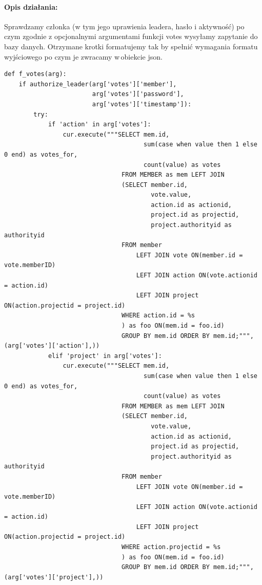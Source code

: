 \documentclass{article}
\begin{document}
\paragraph{Opis działania: }
Sprawdzamy członka (w tym jego uprawienia leadera, hasło i aktywność) po czym zgodnie z opcjonalnymi argumentami funkcji votes wysyłamy zapytanie do bazy danych.
Otrzymane krotki formatujemy tak by spełnić wymagania formatu wyjściowego po czym je zwracamy w\,obiekcie json. \newline
\begin{verbatim}
def f_votes(arg):
    if authorize_leader(arg['votes']['member'], 
                        arg['votes']['password'], 
                        arg['votes']['timestamp']):
        try:
            if 'action' in arg['votes']:
                cur.execute("""SELECT mem.id,
                                      sum(case when value then 1 else 0 end) as votes_for,
                                      count(value) as votes 
                                FROM MEMBER as mem LEFT JOIN
                                (SELECT member.id,
                                        vote.value,
                                        action.id as actionid, 
                                        project.id as projectid, 
                                        project.authorityid as authorityid
                                FROM member
                                    LEFT JOIN vote ON(member.id = vote.memberID)
                                    LEFT JOIN action ON(vote.actionid = action.id)
                                    LEFT JOIN project ON(action.projectid = project.id)
                                WHERE action.id = %s
                                ) as foo ON(mem.id = foo.id)
                                GROUP BY mem.id ORDER BY mem.id;""", (arg['votes']['action'],))
            elif 'project' in arg['votes']:
                cur.execute("""SELECT mem.id,
                                      sum(case when value then 1 else 0 end) as votes_for,
                                      count(value) as votes 
                                FROM MEMBER as mem LEFT JOIN
                                (SELECT member.id,
                                        vote.value,
                                        action.id as actionid, 
                                        project.id as projectid, 
                                        project.authorityid as authorityid
                                FROM member
                                    LEFT JOIN vote ON(member.id = vote.memberID)
                                    LEFT JOIN action ON(vote.actionid = action.id)
                                    LEFT JOIN project ON(action.projectid = project.id)
                                WHERE action.projectid = %s
                                ) as foo ON(mem.id = foo.id)
                                GROUP BY mem.id ORDER BY mem.id;""", (arg['votes']['project'],))


\end{verbatim}
\end{document}
